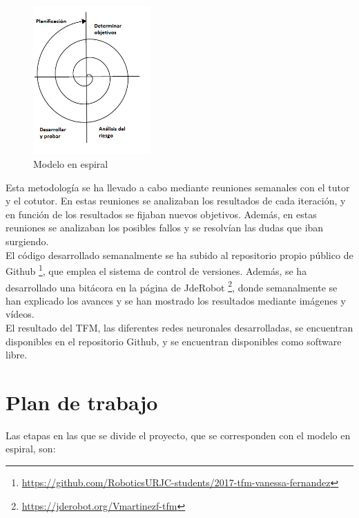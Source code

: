 \begin{figure}[H]
  \begin{center}
    \includegraphics[width=0.4\textwidth]{figures/Objetivos/espiral.png}
		\caption{Modelo en espiral}
		\label{fig.espiral}
		\end{center}
\end{figure}

Esta metodología se ha llevado a cabo mediante reuniones semanales con el tutor y el cotutor. En estas reuniones se analizaban los resultados de cada iteración, y en función de los resultados se fijaban nuevos objetivos. Además, en estas reuniones se analizaban los posibles fallos y se resolvían las dudas que iban surgiendo.\\


El código desarrollado semanalmente se ha subido al repositorio propio público de Github \footnote{\url{https://github.com/RoboticsURJC-students/2017-tfm-vanessa-fernandez}}, que emplea el sistema de control de versiones. Además, se ha desarrollado una bitácora en la página de JdeRobot \footnote{\url{https://jderobot.org/Vmartinezf-tfm}}, donde semanalmente se han explicado los avances y se han mostrado los resultados mediante imágenes y vídeos.\\

El resultado del TFM, las diferentes redes neuronales desarrolladas, se encuentran disponibles en el repositorio Github, y se encuentran disponibles como software libre.



\section{Plan de trabajo}

Las etapas en las que se divide el proyecto, que se corresponden con el modelo en espiral, son:

